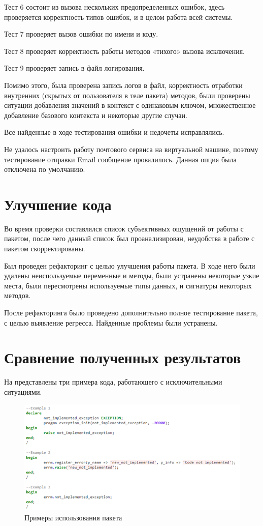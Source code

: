 Тест 6 состоит из вызова нескольких предопределенных ошибок, здесь проверяется корректность типов ошибок, и в целом работа всей системы.

Тест 7 проверяет вызов ошибки по имени и коду.

Тест 8 проверяет корректность работы методов «тихого» вызова исключения. 

Тест 9 проверяет запись в файл логирования. 

Помимо этого, была проверена запись логов в файл, корректность отработки внутренних (скрытых от пользователя в теле пакета) методов, были проверены ситуации добавления значений в контекст с одинаковым ключом, множественное добавление базового контекста и некоторые другие случаи.

Все найденные в ходе тестирования ошибки и недочеты исправлялись. 

Не удалось настроить работу почтового сервиса на виртуальной машине, поэтому тестирование отправки Email сообщение провалилось. Данная опция была отключена по умолчанию. 

\section{Улучшение кода} \label{ch4:sec3}

Во время проверки составлялся список субъективных ощущений от работы с пакетом, после чего данный список был проанализирован, неудобства в работе с пакетом скорректированы. 

Был проведен рефакторинг с целью улучшения работы пакета. В ходе него были удалены неиспользуемые переменные и методы, были устранены некоторые узкие места, были пересмотрены используемые типы данных, и сигнатуры некоторых методов.

После рефакторинга было проведено дополнительно полное тестирование пакета, с целью выявление регресса. Найденные проблемы были устранены. 


\section{Сравнение полученных результатов} \label{ch4:sec4}

На  представлены три примера кода, работающего с исключительными ситуациями. 

\begin{figure}[ht!] 
	\center
	\includegraphics [scale=1] {my_folder/img/c4_examples.png}
	\caption{Примеры использования пакета} 
	\label{fig:c4_examples}  
\end{figure}
\FloatBarrier

